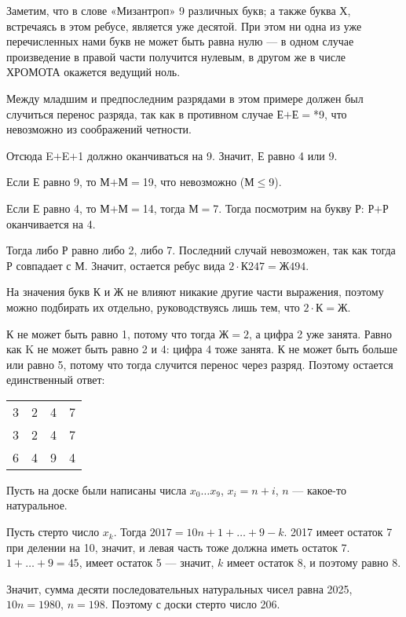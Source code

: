 ﻿
\begin{itemize}

\itA Заметим, что в слове «Мизантроп» 9 различных букв; а также буква Х, встречаясь в этом ребусе, является уже десятой. При этом ни одна из уже перечисленных нами букв не может быть равна нулю — в одном случае произведение в правой части получится нулевым, в другом же в числе ХРОМОТА окажется ведущий ноль.

\itB Между младшим и предпоследним разрядами в этом примере должен был случиться перенос разряда, так как в противном случае Е$+$Е$=$*9, что невозможно из соображений четности.

Отсюда E$+$E$+$1 должно оканчиваться на 9. Значит, Е равно 4 или 9.

\subitem Если Е равно 9, то М$+$М$=$19, что невозможно (М$\le$9).

\subitem Если Е равно 4, то М$+$М$=$14, тогда М$=$7. Тогда посмотрим на букву Р: Р$+$Р оканчивается на 4.

Тогда либо Р равно либо 2, либо 7. Последний случай невозможен, так как тогда Р совпадает с М. Значит, остается ребус вида $2 \cdot \text{К247} = \text{Ж494}$.

На значения букв К и Ж не влияют никакие другие части выражения, поэтому можно подбирать их отдельно, руководствуясь лишь тем, что $2 \cdot \text{К} = \text{Ж}$.

К не может быть равно 1, потому что тогда $\text{Ж} = 2$, а цифра 2 уже занята. Равно как K не может быть равно 2 и 4: цифра 4 тоже занята. К не может быть больше или равно 5, потому что тогда случится перенос через разряд. Поэтому остается единственный ответ:

\begin{center} \begin{tabular}{cccc}
	3 & 2 & 4 & 7 \\
	3 & 2 & 4 & 7 \\ \hline
	6 & 4 & 9 & 4
\end{tabular} \end{center}

\itC Пусть на доске были написаны числа $x_0 \ldots x_9$, $x_i = n+i$, $n$ — какое-то натуральное.

Пусть стерто число $x_k$. Тогда $2017 = 10n+ 1 + \ldots + 9 - k$. 2017 имеет остаток 7 при делении на 10, значит, и левая часть тоже должна иметь остаток 7. $1 + \ldots + 9 = 45$, имеет остаток 5 — значит, $k$ имеет остаток 8, и поэтому равно 8.

Значит, сумма десяти последовательных натуральных чисел равна 2025, $10n = 1980$, $n=198$. Поэтому с доски стерто число 206.
\end{itemize}